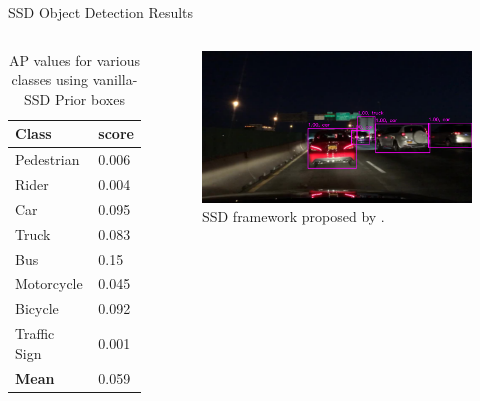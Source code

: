 \documentclass[10pt, aspectratio=169]{beamer}
\begin{document}
\begin{frame}[allowframebreaks]{SSD Object Detection Results}

    \begin{columns}
            \begin{table}
                \caption{AP values for various classes using vanilla-SSD Prior boxes}
                \begin{tabular}{ll}
                    \hline
                        \textbf{Class} & \textbf{score} \\ \hline
                        Pedestrian     & 0.006              \\ \hline
                        Rider          & 0.004              \\ \hline
                        Car            & 0.095              \\ \hline
                        Truck          & 0.083              \\ \hline
                        Bus            & 0.15               \\ \hline 
                        Motorcycle     & 0.045              \\ \hline
                        Bicycle        & 0.092              \\ \hline
                        Traffic Sign   & 0.001              \\ \hline
                        \textbf{Mean}  & 0.059  \\\hline
                \end{tabular}
            \end{table}
            \begin{figure}[!ht]
                \centering
                \includegraphics[scale=0.175]{images/9.png}
                \caption[SSD framework]{SSD framework proposed by \citet[p. 24]{Liu2016SSDSS}.}
            \end{figure}
    \end{columns}


\end{frame}
\end{document}
